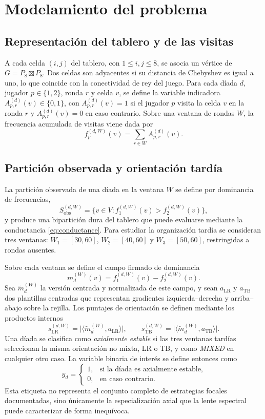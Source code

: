 \documentclass[journal]{IEEEtran}
\newcommand{\Sobs}{S_{\mathrm{obs}}}
\begin{document}
\section{Modelamiento del problema}\label{sec:modelamiento}

\subsection{Representación del tablero y de las visitas}

A cada celda $(i,j)$ del tablero, con $1 \le i,j \le 8$, se asocia un vértice de $G = P_8 \boxtimes P_8$. Dos celdas son adyacentes si su distancia de Chebyshev es igual a uno, lo que coincide con la conectividad de rey del juego. Para cada díada $d$, jugador $p \in \{1,2\}$, ronda $r$ y celda $v$, se define la variable indicadora $A^{(d)}_{p,r}(v) \in \{0,1\}$, con $A^{(d)}_{p,r}(v) = 1$ si el jugador $p$ visita la celda $v$ en la ronda $r$ y $A^{(d)}_{p,r}(v) = 0$ en caso contrario. Sobre una ventana de rondas $W$, la frecuencia acumulada de visitas viene dada por
\[
f_p^{(d,W)}(v) = \sum_{r \in W} A^{(d)}_{p,r}(v).
\]

\subsection{Partición observada y orientación tardía}

La partición observada de una díada en la ventana $W$ se define por dominancia de frecuencias,
\begin{equation}
\Sobs^{(d,W)} = \bigl\{v \in V : f_1^{(d,W)}(v) > f_2^{(d,W)}(v) \bigr\},
\label{eq:partition}
\end{equation}
y produce una bipartición dura del tablero que puede evaluarse mediante la conductancia \eqref{eq:conductance}. Para estudiar la organización tardía se consideran tres ventanas: $W_1 = [30,60]$, $W_2 = [40,60]$ y $W_3 = [50,60]$, restringidas a rondas ausentes.

Sobre cada ventana se define el campo firmado de dominancia
\[
m_d^{(W)}(v) = f_1^{(d,W)}(v) - f_2^{(d,W)}(v).
\]
Sea $\tilde m_d^{(W)}$ la versión centrada y normalizada de este campo, y sean $a_{\mathrm{LR}}$ y $a_{\mathrm{TB}}$ dos plantillas centradas que representan gradientes izquierda--derecha y arriba--abajo sobre la rejilla. Los puntajes de orientación se definen mediante los productos internos
\[
s_{\mathrm{LR}}^{(d,W)} = \bigl|\langle \tilde m_d^{(W)}, a_{\mathrm{LR}} \rangle\bigr|,
\qquad
s_{\mathrm{TB}}^{(d,W)} = \bigl|\langle \tilde m_d^{(W)}, a_{\mathrm{TB}} \rangle\bigr|.
\]
Una díada se clasifica como \emph{axialmente estable} si las tres ventanas tardías seleccionan la misma orientación no mixta, LR o TB, y como \emph{MIXED} en cualquier otro caso. La variable binaria de interés se define entonces como
\[
y_d = \begin{cases} 1, & \text{si la díada es axialmente estable,}\\ 0, & \text{en caso contrario.}\end{cases}
\]
Esta etiqueta no representa el conjunto completo de estrategias focales documentadas, sino únicamente la especialización axial que la lente espectral puede caracterizar de forma inequívoca.
\end{document}
